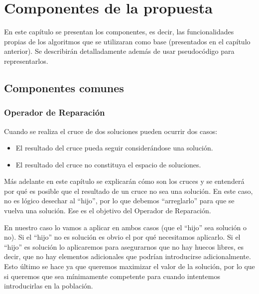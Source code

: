 \chapter{Componentes de la propuesta}

En este capítulo se presentan los componentes, es decir, las funcionalidades propias de los algoritmos que se utilizaran como base (presentados en el capítulo anterior). 
Se describirán detalladamente además de usar pseudocódigo para representarlos.

\section{Componentes comunes}

\subsection{Operador de Reparación}

Cuando se realiza el cruce de dos soluciones pueden ocurrir dos casos:
\begin{itemize}
	\item El resultado del cruce pueda seguir considerándose una solución.
	\item El resultado del cruce no constituya el espacio de soluciones.
\end{itemize}

Más adelante en este capítulo se explicarán cómo son los cruces y se entenderá por qué es posible que el resultado de un cruce no sea una solución. 
En este caso, no es lógico desechar al ``hijo'', por lo que debemos ``arreglarlo'' para que se vuelva una solución. 
Ese es el objetivo del Operador de Reparación. 

En nuestro caso lo vamos a aplicar en ambos casos (que el ``hijo'' sea solución o no). 
Si el ``hijo'' no es solución es obvio el por qué necesitamos aplicarlo. 
Si el ``hijo'' es solución lo aplicaremos para asegurarnos que no hay huecos libres, es decir, que no hay elementos adicionales que podrían introducirse adicionalmente. 
Esto último se hace ya que queremos maximizar el valor de la solución, por lo que si queremos que sea mínimamente competente para cuando intentemos introducirlas en la población. 

